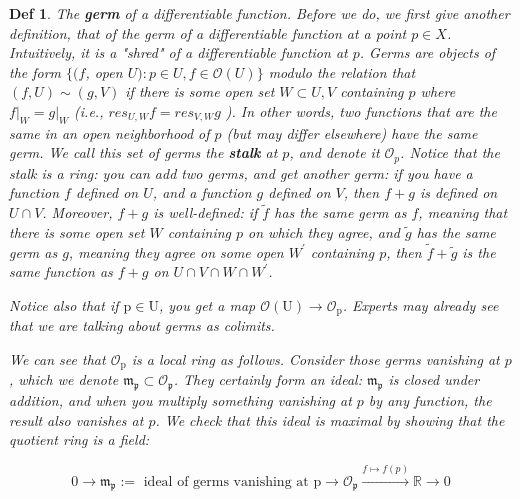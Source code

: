 \documentclass{article}
\newtheorem{definition}[theorem]{Def}
\begin{document}
\begin{definition}
The \textbf{germ} of a differentiable function. Before we do, we first give another definition, that of the germ of a differentiable function at a point $p \in X$. Intuitively, it is a "shred" of a differentiable function at $p$. Germs are objects of the form $\{(f$, open $U): p \in U, f \in \mathscr{O}(U)\}$ modulo the relation that $(f, U) \sim(g, V)$ if there is some open set $W \subset U, V$ containing $p$ where $\left.f\right|_{W}=\left.g\right|_{W}$ (i.e., $res_{U, W} f= res _{V, W} g$ ). In other words, two functions that are the same in an open neighborhood of $p$ (but may differ elsewhere) have the same germ. We call this set of germs the \textbf{stalk} at $p$, and denote it $\mathscr{O}_{p}$. Notice that the stalk is a ring: you can add two germs, and get another germ: if you have a function $f$ defined on $U$, and a function $g$ defined on $V$, then $f+g$ is defined on $U \cap V$. Moreover, $f+g$ is well-defined: if $\tilde{f}$ has the same germ as $f$, meaning that there is some open set $W$ containing $p$ on which they agree, and $\tilde{g}$ has the same germ as $g$, meaning they agree on some open $W^{\prime}$ containing $p$, then $\tilde{f}+\tilde{g}$ is the same function as $f+g$ on $U \cap V \cap W \cap W^{\prime}$.

Notice also that if $\mathrm{p} \in \mathrm{U}$, you get a map $\mathscr{O}(\mathrm{U}) \rightarrow \mathscr{O}_{\mathrm{p}}$. Experts may already see that we are talking about germs as colimits.

We can see that $\mathscr{O}_{\mathrm{p}}$ is a local ring as follows. Consider those germs vanishing at $p$, which we denote $\mathfrak{m}_{\mathfrak{p}} \subset \mathscr{O}_{\mathfrak{p}}$. They certainly form an ideal: $\mathfrak{m}_{\mathfrak{p}}$ is closed under addition, and when you multiply something vanishing at $p$ by any function, the result also vanishes at $p$. We check that this ideal is maximal by showing that the quotient ring is a field:

$$
0 \longrightarrow \mathfrak{m}_{\mathfrak{p}}:=\text { ideal of germs vanishing at } \mathrm{p} \longrightarrow \mathscr{O}_{\mathfrak{p}} \stackrel{f \mapsto f(p)}{\longrightarrow} \mathbb{R} \longrightarrow 0
$$
\end{definition}
\end{document}

